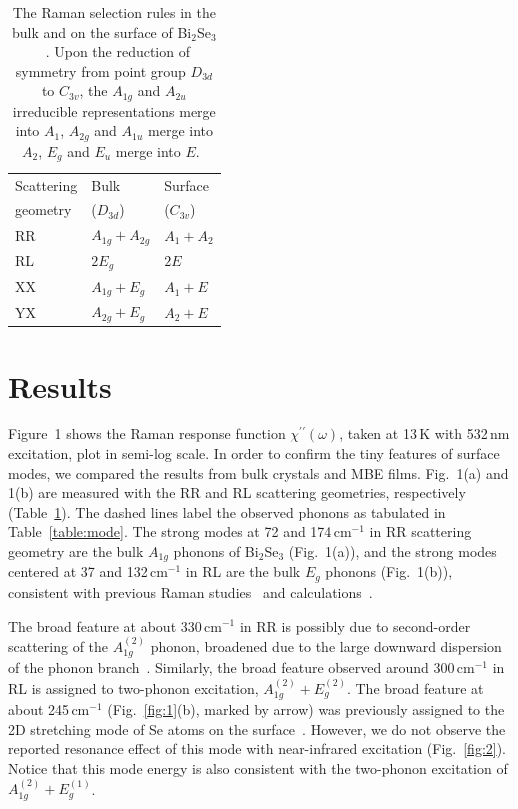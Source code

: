 \documentclass[reprint,aps,pra,superscriptaddress,amsmath,amssymb,linenumbers,longbibliography]{revtex4-1}
\begin{document}
%
\begin{table}[b]
	\caption{\label{table:IRR}
		The Raman selection rules in the bulk and on the surface of Bi$_2$Se$_3$~\cite{Ovander1960,Cardona1982}.
		Upon the reduction of symmetry from point group $D_{3d}$ to $C_{3v}$, the $A_{1g}$ and $A_{2u}$ irreducible representations merge into $A_1$, $A_{2g}$ and $A_{1u}$ merge into $A_{2}$, $E_{g}$ and $E_{u}$ merge into $E$.~\cite{Koster1963}}
	\setlength{\tabcolsep}{8pt}
	\setlength{\extrarowheight}{3pt}
	\vspace{5pt}
	\begin{tabular}{l l l}
		\hline\hline
		Scattering & Bulk & Surface \\
		geometry & ($D_{3d}$) & ($C_{3v}$) \\
		\hline
		RR & $A_{1g}+A_{2g}$ & $A_{1}+A_{2}$ \\ 
		RL & $2E_g$ & $2E$ \\
		XX & $A_{1g}+E_g$ & $A_{1}+E$ \\
		YX & $A_{2g}+E_g$ & $A_{2}+E$ \\
		\hline\hline
	\end{tabular} 
\end{table}
%
\section{Results}\label{sec:Results}
Figure~1 shows the Raman response function $\chi^{\prime\prime}(\omega)$, taken at 13\,K with 532\,nm excitation, plot in semi-log scale.
In order to confirm the tiny features of surface modes, we compared the results from bulk crystals and MBE films.
Fig.~1(a) and 1(b) are measured with the RR and RL scattering geometries, respectively (Table~\ref{table:IRR}).
The dashed lines label the observed phonons as tabulated in Table~\ref{table:mode}.
The strong modes at 72 and 174\,cm$^{-1}$ in RR scattering geometry are the bulk $A_{1g}$ phonons of Bi$_2$Se$_3$ (Fig.~1(a)), and the strong modes centered at 37 and 132\,cm$^{-1}$ in RL are the bulk $E_g$ phonons (Fig.~1(b)), consistent with previous Raman studies~\cite{Zhang2011,Gnezdilov2011} and calculations~\cite{Wang2012}.

The broad feature at about 330\,cm$^{-1}$ in RR is possibly due to second-order scattering of the $A_{1g}^{(2)}$ phonon, broadened due to the large downward dispersion of the phonon branch~\cite{Wang2012}.
Similarly, the broad feature observed around 300\,cm$^{-1}$ in RL is assigned to two-phonon excitation, $A_{1g}^{(2)}+E_g^{(2)}$.
The broad feature at about 245\,cm$^{-1}$ (Fig.~\ref{fig:1}(b), marked by arrow) was previously assigned to the 2D stretching mode of Se atoms on the surface~\cite{Glinka2015A}.
However, we do not observe the reported resonance effect of this mode with near-infrared excitation (Fig.~\ref{fig:2}).
Notice that this mode energy is also consistent with the two-phonon excitation of $A_{1g}^{(2)}+E_g^{(1)}$.
\end{document}
